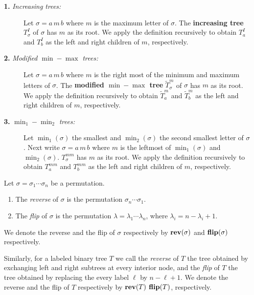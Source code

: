\begin{description}

\item[{\bf 1.} {\em Increasing trees:}]

Let $\sigma = a \,m \,b$ where $m$ is the maximum letter of $\sigma$.
The  {\bf increasing tree} $T^I_\sigma$ of $\sigma$ has $m$ as its root.
We apply the definition recursively to obtain $T_{a}^{I}$ and 
$T^{I}_b$ as the left  and right children of $m$, respectively.

\item[{\bf 2.} {\em Modified $\min-\max$ trees:}]

Let $\sigma = a \,m \,b$ where $m$ is the right most of the minimum and
maximum letters of  $\sigma$.
The  {\bf modified $\min-\max$ tree} $\tilde{T}^m_\sigma$ of $\sigma$ has
$m$ as its root. We apply the definition recursively to obtain
$\tilde{T}_{a}^{m}$ and  $\tilde{T}^{m}_b$ as the left  and right
children of $m$, respectively. 

\item[{\bf 3.} {\em $\min_1-\min_2$ trees:}]

Let $\min_1(\sigma)$ the smallest and $\min_2(\sigma)$ the second
smallest letter of $\sigma$.
Next write $\sigma = a\,m\,b$ where $m$ is the leftmost of $\min_1(\sigma)$ and $\min_2(\sigma)$. $T^{mm}_{\sigma}$ has $m$ as its 
root.  We apply the definition recursively to obtain $T_{a}^{mm}$ and 
$T^{mm}_b$ as the left  and right children of $m$, respectively.
\end{description}

\begin{define} Let $\sigma = \sigma_1\cdots \sigma_n$ be a permutation.
\begin{enumerate}
\item The  {\em reverse} of $\sigma$
is the permutation $\sigma_n \cdots \sigma_1$.
\item  The {\em flip} of $\sigma$ is the permutation $\lambda
= \lambda_1 \cdots \lambda_n$, where $\lambda_i = n-\lambda_i+1$. 
\end{enumerate}
We denote the reverse and the flip of $\sigma$ respectively by ${\bf rev}
(\sigma)$ and ${\bf flip} (\sigma)$ respectively.
\end{define}

Similarly, for a labeled binary tree $T$ we call the {\em reverse} of
$T$ the tree obtained by exchanging left and right
subtrees at every interior node, and the {\em flip} of $T$ the tree
obtained by replacing the every label $\ell$ by $n-\ell+1$. 
We denote the reverse and the flip of $T$ respectively by ${\bf rev} (T)$
${\bf flip} (T)$,  respectively.

